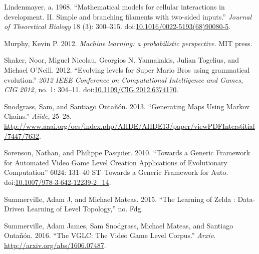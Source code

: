 \documentclass[A4paper,]{article}
\begin{document}
\hypertarget{ref-Lindenmayer1968}{}
Lindenmayer, a. 1968. ``Mathematical models for cellular interactions in
development. II. Simple and branching filaments with two-sided inputs.''
\emph{Journal of Theoretical Biology} 18 (3): 300--315.
doi:\href{https://doi.org/10.1016/0022-5193(68)90080-5}{10.1016/0022-5193(68)90080-5}.

\hypertarget{ref-Murphy2012}{}
Murphy, Kevin P. 2012. \emph{Machine learning: a probabilistic
perspective}. MIT press.

\hypertarget{ref-Shaker2012}{}
Shaker, Noor, Miguel Nicolau, Georgios N. Yannakakis, Julian Togelius,
and Michael O'Neill. 2012. ``Evolving levels for Super Mario Bros using
grammatical evolution.'' \emph{2012 IEEE Conference on Computational
Intelligence and Games, CIG 2012}, no. 1: 304--11.
doi:\href{https://doi.org/10.1109/CIG.2012.6374170}{10.1109/CIG.2012.6374170}.

\hypertarget{ref-Snodgrass2013}{}
Snodgrass, Sam, and Santiago Ontañón. 2013. ``Generating Maps Using
Markov Chains.'' \emph{Aiide}, 25--28.
\url{http://www.aaai.org/ocs/index.php/AIIDE/AIIDE13/paper/viewPDFInterstitial/7447/7632}.

\hypertarget{ref-Sorenson2010}{}
Sorenson, Nathan, and Philippe Pasquier. 2010. ``Towards a Generic
Framework for Automated Video Game Level Creation Applications of
Evolutionary Computation'' 6024: 131--40 ST--Towards a Generic Framework
for Auto.
doi:\href{https://doi.org/10.1007/978-3-642-12239-2_14}{10.1007/978-3-642-12239-2\_14}.

\hypertarget{ref-Summerville2015}{}
Summerville, Adam J, and Michael Mateas. 2015. ``The Learning of Zelda :
Data-Driven Learning of Level Topology,'' no. Fdg.

\hypertarget{ref-Summerville2016}{}
Summerville, Adam James, Sam Snodgrass, Michael Mateas, and Santiago
Ontañón. 2016. ``The VGLC: The Video Game Level Corpus.'' \emph{Arxiv}.
\url{http://arxiv.org/abs/1606.07487}.
\end{document}
